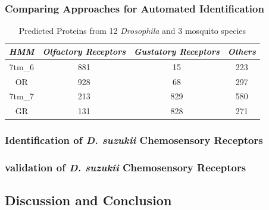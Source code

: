 \subsubsection{Comparing Approaches for Automated Identification}

\begin{table}[H]
  \centering
  \begin{tabular}{c c c c} \hline
  \emph{HMM} & \emph{Olfactory Receptors} & \emph{Gustatory Receptors} & \emph{Others} \\ \hline
  7tm\_6 & 881 & 15 & 223 \\ \hline
  OR & 928 & 68 & 297 \\ \hline
  7tm\_7 & 213 & 829 & 580 \\ \hline
  GR & 131 & 828 & 271 \\ \hline
  \end{tabular}
  \caption{Predicted Proteins from 12 \textit{Drosophila} and 3 mosquito species}
  \label{tab:chemosensory:hmm-validation}
\end{table}

\subsubsection{Identification of \emph{D. suzukii} Chemosensory Receptors}

\subsubsection{validation of \emph{D. suzukii} Chemosensory Receptors}

\subsection{Discussion and Conclusion}